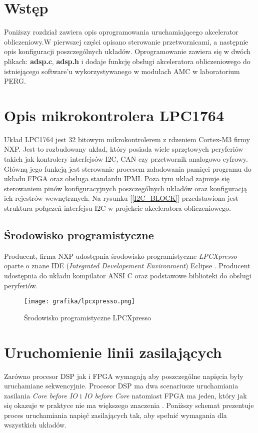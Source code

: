 

\section{Wstęp}
Poniższy rozdział zawiera opis oprogramowania uruchamiającego akcelerator obliczeniowy.W pierwszej części opisano sterowanie przetwornicami, a następnie opis konfiguracji poszczególnych układów.  Oprogramowanie zawiera się w dwóch plikach: \textbf{adsp.c}, \textbf{adsp.h} i dodaje funkcję obsługi akceleratora obliczeniowego do istniejącego software'u wykorzystywanego w modułach AMC w laboratorium PERG. 


\section{Opis mikrokontrolera LPC1764}

Układ LPC1764 jest 32 bitowym mikrokontrolerem z rdzeniem Cortex-M3 firmy NXP. Jest to rozbudowany układ, który posiada wiele sprzętowych peryferiów takich jak kontrolery interfejsów I2C, CAN czy przetwornik analogowo cyfrowy. Główną jego funkcją jest sterowanie procesem załadowania pamięci programu do układu FPGA oraz obsługa standardu IPMI. Poza tym układ zajmuje się sterowaniem pinów konfiguracyjnych poszczególnych układów oraz konfiguracją ich rejestrów wewnętrznych. Na rysunku [\ref{I2C_BLOCK}] przedstawiona jest struktura połączeń interfejsu I2C w projekcie akceleratora obliczeniowego. 

\subsection{Środowisko programistyczne}
Producent, firma NXP \cite{COMPANY:NXP} udostępnia środowisko programistyczne \textit{LPCXpresso} oparte o znane IDE (\textit{Integrated Developement Environment}) Eclipse \cite{ECLIPSE}. Producent udostępnia do układu kompilator ANSI C oraz podstawowe biblioteki do obsługi peryferiów.

\begin{figure}[!ht]
\centering
\texttt{[image: grafika/lpcxpresso.png]}
\caption{Środowisko programistyczne LPCXpresso}
\end{figure}

\section{Uruchomienie linii zasilających}

Zarówno procesor DSP jak i FPGA wymagają aby poszczególne napięcia były uruchamiane sekwencyjnie. Procesor DSP ma dwa scenariusze uruchamiania zasilania \textit{Core before IO} i \textit{IO before Core} natomiast FPGA ma jeden, który jak się okazuje w praktyce nie ma większego znaczenia \cite{DATASHEET:TMS} \cite{FPGA:DS181}. Poniższy schemat prezentuje proces uruchamiania napięć zasilających tak, aby spełnić wymagania dla wszystkich układów.


